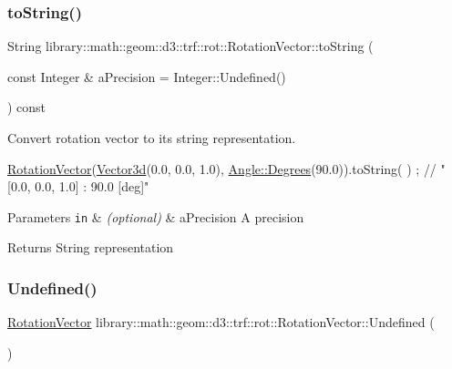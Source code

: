 \subsubsection{\texorpdfstring{to\+String()}{toString()}}
{\footnotesize\ttfamily String library\+::math\+::geom\+::d3\+::trf\+::rot\+::\+Rotation\+Vector\+::to\+String (\begin{DoxyParamCaption}\item[{const Integer \&}]{a\+Precision = {\ttfamily Integer\+:\+:Undefined()} }\end{DoxyParamCaption}) const}



Convert rotation vector to its string representation. 


\begin{DoxyCode}
\hyperlink{classlibrary_1_1math_1_1geom_1_1d3_1_1trf_1_1rot_1_1_rotation_vector_a49076a279f457fdb14c4a9d4d61e1738}{RotationVector}(\hyperlink{namespacelibrary_1_1math_1_1obj_a977e84e9bf317a4e7dd9d6d671d6da2f}{Vector3d}(0.0, 0.0, 1.0), \hyperlink{classlibrary_1_1math_1_1geom_1_1_angle_a64aa53e8420aeb6f671d86c65c370bc8}{Angle::Degrees}(90.0)).toString(
      ) ; \textcolor{comment}{// "[0.0, 0.0, 1.0] : 90.0 [deg]"}
\end{DoxyCode}



\begin{DoxyParams}[1]{Parameters}
\mbox{\tt in}  & {\em (optional)} & a\+Precision A precision \\
\hline
\end{DoxyParams}
\begin{DoxyReturn}{Returns}
String representation 
\end{DoxyReturn}
\mbox{\label{classlibrary_1_1math_1_1geom_1_1d3_1_1trf_1_1rot_1_1_rotation_vector_a4ab50dc44c938485c102c4c70006c04b}} 
\subsubsection{\texorpdfstring{Undefined()}{Undefined()}}
{\footnotesize\ttfamily \hyperlink{classlibrary_1_1math_1_1geom_1_1d3_1_1trf_1_1rot_1_1_rotation_vector}{Rotation\+Vector} library\+::math\+::geom\+::d3\+::trf\+::rot\+::\+Rotation\+Vector\+::\+Undefined (\begin{DoxyParamCaption}{ }\end{DoxyParamCaption})\hspace{0.3cm}{\ttfamily [static]}}



